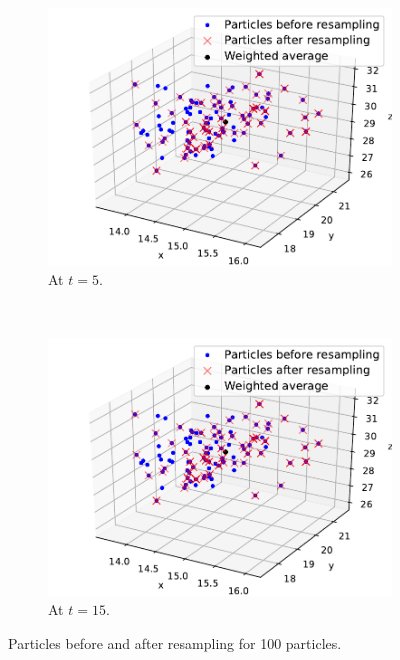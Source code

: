 \documentclass[english, DIV=13]{scrartcl}
\begin{document}
\begin{figure}
    \centering
    \begin{subfigure}{0.49\textwidth}
        \includegraphics[width=\textwidth]{figures/particles-5-100}
        \caption{At $t=5$.}
        \label{fig:particle-5-100}
    \end{subfigure}%
    ~
    \begin{subfigure}{0.49\textwidth}
        \includegraphics[width=\textwidth]{figures/particles-5-100}
        \caption{At $t=15$.}
        \label{fig:particle-15-100}
    \end{subfigure}
    \caption{Particles before and after resampling for 100 particles.}
\end{figure}
\end{document}
